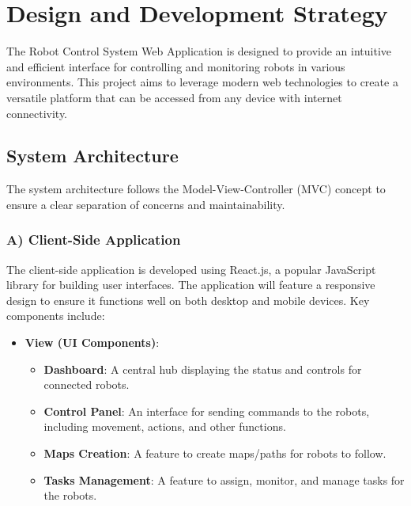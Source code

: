 \section{Design and Development Strategy}

The Robot Control System Web Application is designed to provide an intuitive and efficient interface for controlling and monitoring robots in various environments. This project aims to leverage modern web technologies to create a versatile platform that can be accessed from any device with internet connectivity.

\subsection{System Architecture}
\vspace{-1.5mm}
The system architecture follows the Model-View-Controller (MVC) concept to ensure a clear separation of concerns and maintainability.
\vspace{-3mm}
\subsubsection{A) Client-Side Application}
\vspace{-2.5mm}
The client-side application is developed using React.js, a popular JavaScript library for building user interfaces. The application will feature a responsive design to ensure it functions well on both desktop and mobile devices. Key components include:
\vspace{-1mm}
\begin{itemize}
    \item \textbf{View (UI Components)}:
    \begin{itemize}
    \vspace{-1mm}
        \item \textbf{Dashboard}: A central hub displaying the status and controls for connected robots.
        \vspace{-1mm}
        \item \textbf{Control Panel}: An interface for sending commands to the robots, including movement, actions, and other functions.
        \vspace{-1mm}
        \item \textbf{Maps Creation}: A feature to create maps/paths for robots to follow.
        \vspace{-1mm}
        \item \textbf{Tasks Management}: A feature to assign, monitor, and manage tasks for the robots.
    \end{itemize}
\end{itemize}
\newpage

